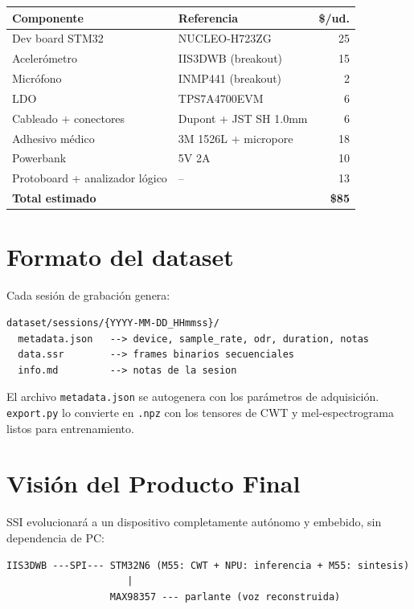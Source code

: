 \documentclass[10pt,a4paper]{article}
\begin{document}
\begin{tabularx}{\textwidth}{l l r}
\toprule
\textbf{Componente} & \textbf{Referencia} & \textbf{\$/ud.} \\
\midrule
Dev board STM32 & NUCLEO-H723ZG & 25 \\
Acelerómetro & IIS3DWB (breakout) & 15 \\
Micrófono & INMP441 (breakout) & 2 \\
LDO & TPS7A4700EVM & 6 \\
Cableado + conectores & Dupont + JST SH 1.0mm & 6 \\
Adhesivo médico & 3M 1526L + micropore & 18 \\
Powerbank & 5V 2A & 10 \\
Protoboard + analizador lógico & -- & 13 \\
\midrule
\textbf{Total estimado} & & \textbf{\$85} \\
\bottomrule
\end{tabularx}

\section{Formato del dataset}

Cada sesión de grabación genera:

\begin{lstlisting}[style=mini]
dataset/sessions/{YYYY-MM-DD_HHmmss}/
  metadata.json   --> device, sample_rate, odr, duration, notas
  data.ssr        --> frames binarios secuenciales
  info.md         --> notas de la sesion
\end{lstlisting}

El archivo \texttt{metadata.json} se autogenera con los parámetros de
adquisición. \texttt{export.py} lo convierte en \texttt{.npz} con los
tensores de CWT y mel-espectrograma listos para entrenamiento.

\section{Visión del Producto Final}

SSI evolucionará a un dispositivo completamente autónomo y embebido,
sin dependencia de PC:

\begin{lstlisting}[style=mini]
IIS3DWB ---SPI--- STM32N6 (M55: CWT + NPU: inferencia + M55: sintesis)
                     |
                  MAX98357 --- parlante (voz reconstruida)
\end{lstlisting}
\end{document}
